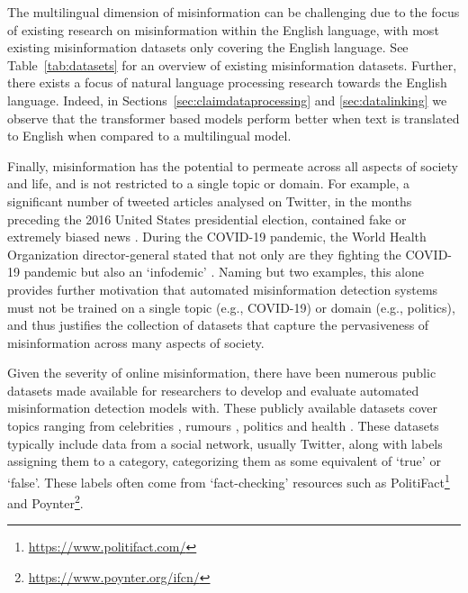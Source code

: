 \documentclass[sigconf,natbib=true,anonymous=false,nonacm]{acmart}
\begin{document}
The multilingual dimension of misinformation can be challenging due to the
focus of existing research on misinformation within the English language, with
most existing misinformation datasets only covering the English language. See
Table~\ref{tab:datasets} for an overview of existing misinformation datasets.
Further, there exists a focus of natural language processing research towards
the English language. Indeed, in Sections~\ref{sec:claimdataprocessing} and
\ref{sec:datalinking} we observe that the transformer based models perform
better when text is translated to English when compared to a multilingual
model.

Finally, misinformation has the potential to permeate across all aspects of
society and life, and is not restricted to a single topic or domain. For
example, a significant number of tweeted articles analysed on Twitter, in the
months preceding the 2016 United States presidential election, contained fake
or extremely biased news \citep{bovet2019fakenews}. During the COVID-19
pandemic, the World Health Organization director-general stated that not only
are they fighting the COVID-19 pandemic but also an `infodemic'
\citep{lancet2020infodemic}. Naming but two examples, this alone provides
further motivation that automated misinformation detection systems must not be
trained on a single topic (e.g., COVID-19) or domain (e.g., politics), and
thus justifies the collection of datasets that capture the pervasiveness of
misinformation across many aspects of society.

Given the severity of online misinformation, there have been numerous public
datasets made available for researchers to develop and evaluate automated
misinformation detection models with. These publicly available datasets cover
topics ranging from celebrities \citep{perez2018automatic}, rumours
\citep{zubiaga2017exploiting}, politics \citep{shu2020fakenewsnet} and health
\citep{li2020mmcovid}. These datasets typically include data from a social
network, usually Twitter, along with labels assigning them to a category,
categorizing them as some equivalent of `true' or `false'. These labels often
come from `fact-checking' resources such as
PolitiFact\footnote{\url{https://www.politifact.com/}} and
Poynter\footnote{\url{https://www.poynter.org/ifcn/}}.
\end{document}
